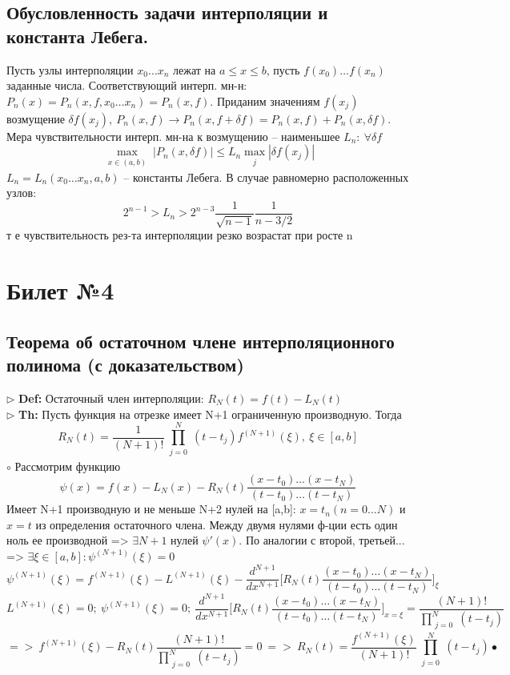 \documentclass[a4paper]{article}
\begin{document}
\subsection{Обусловленность задачи интерполяции и константа Лебега.}
Пусть узлы интерполяции $x_0 \ldots x_n$ лежат на $a \leq x \leq b$, пусть $f(x_0) \ldots f(x_n)$ заданные числа. Соответствующий интерп. мн-н: $P_n(x) = P_n(x,f,x_0 \ldots x_n) = P_n(x,f)$. Приданим значениям $f(x_j)$ возмущение $\delta f(x_j), \ P_n(x,f) \rightarrow P_n(x, f + \delta f) = P_n(x,f) + P_n(x, \delta f)$.
Мера чувствительности интерп. мн-на к возмущению – наименьшее $L_n: \ \forall \delta f$ $$\max_{\substack{x \in (a,b)}} |P_n(x,\delta f)| \leq L_n \max_{\substack{j}} |\delta f(x_j)|$$
$L_n = L_n(x_0 \ldots x_n,a,b)$ – константы Лебега. В случае равномерно расположенных узлов: $$2^{n-1} > L_n > 2^{n-3} \frac{1}{\sqrt{n-1}} \frac{1}{n-3/2} $$ т е чувствительность рез-та интерполяции резко возрастат при росте n  

\section{Билет №4}
\subsection{Теорема об остаточном члене интерполяционного полинома (с доказательством)}
$\triangleright$ \textbf{Def:} Остаточный член интерполяции: $ R_N(t) = f(t) - L_N(t)$\\
$\triangleright$ \textbf{Th:} Пусть функция на отрезке имеет N+1 ограниченную производную. Тогда
$$ R_N(t) = \frac{1}{(N+1)!} \prod_{\substack{j=0}}^N(t-t_j)f^{(N+1)}(\xi), \ \xi \in [a,b] $$
	$\circ$ 
	Рассмотрим функцию $$ \psi(x)=f(x)-L_N(x) - R_N(t) \frac{(x-t_0)\ldots (x-t_N)}{(t-t_0)\ldots (t-t_N)} $$
	Имеет N+1 производную и не меньше N+2 нулей на [a,b]: $x=t_n (n=0\ldots N)$ и $x=t$ из определения остаточного члена. Между двумя нулями ф-ции есть один ноль ее производной => $\exists N+1$ нулей $\psi'(x)$. По аналогии с второй, третьей... => $\exists \xi \in [a,b]: \psi^{(N+1)}(\xi)=0$
	$$ \psi^{(N+1)}(\xi) = f^{(N+1)}(\xi) - L^{(N+1)}(\xi) - \frac{d^{N+1}}{dx^{N+1}} \bigg[ R_N(t)\frac{(x-t_0)\ldots (x-t_N)}{(t-t_0)\ldots (t-t_N)} \bigg]_\xi $$
	$$ L^{(N+1)}(\xi)=0;\ \psi^{(N+1)}(\xi)=0;\ \frac{d^{N+1}}{dx^{N+1}} \bigg[ R_N(t)\frac{(x-t_0)\ldots (x-t_N)}{(t-t_0)\ldots (t-t_N)} \bigg]_{x=\xi} = \frac{(N+1)!}{\prod_{\substack{j=0}}^N(t-t_j)} $$
	$$ => \ f^{(N+1)}(\xi)-R_N(t)\frac{(N+1)!}{\prod_{\substack{j=0}}^N(t-t_j)} = 0 \ => \ R_N(t) = \frac{f^{(N+1)}(\xi)}{(N+1)!}\prod_{\substack{j=0}}^N(t-t_j) \bullet $$
\end{document}
